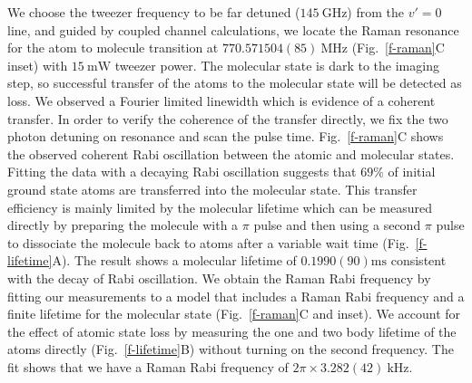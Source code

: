\documentclass[aps,prl,twocolumn,superscriptaddress]{revtex4-1}
\newcommand{\todo}[1]{}
\begin{document}
We choose the tweezer frequency to be far detuned ($145 ~\mathrm{GHz}$) from the $v' = 0$ line, and guided by coupled channel calculations,
we locate the Raman resonance for the atom to molecule transition at
$770.571504(85) ~\mathrm{MHz}$ (Fig.~\ref{f-raman}C inset)
with $15 ~\mathrm{mW}$ tweezer power. 
The molecular state is dark to the imaging step,
so successful transfer of the atoms to the molecular state will be detected as loss.
We observed a Fourier limited linewidth which is evidence of a coherent transfer.
In order to verify the coherence of the transfer directly,
we fix the two photon detuning on resonance and scan the pulse time.
Fig.~\ref{f-raman}C shows the observed coherent Rabi oscillation between the atomic and molecular states.
Fitting the data with a decaying Rabi oscillation suggests that
$69\%$ of initial ground state atoms are transferred into the molecular state.
This transfer efficiency is mainly limited by the molecular lifetime
which can be measured directly by preparing the molecule with a $\pi $ pulse
and then using a second $\pi$ pulse to dissociate the molecule back to atoms
after a variable wait time (Fig.~\ref{f-lifetime}A).
The result shows a molecular lifetime of $0.1990(90) \mathrm{ms}$
consistent with the decay of Rabi oscillation.
We obtain the Raman Rabi frequency by fitting our measurements to a model
that includes a Raman Rabi frequency and
a finite lifetime for the molecular state (Fig.~\ref{f-raman}C and inset).
We account for the effect of atomic state loss by measuring the one and
two body lifetime of the atoms directly (Fig.~\ref{f-lifetime}B)
without turning on the second frequency.
The fit shows that we have a Raman Rabi frequency of $2\pi\times3.282(42) ~\mathrm{kHz}$.
\end{document}
